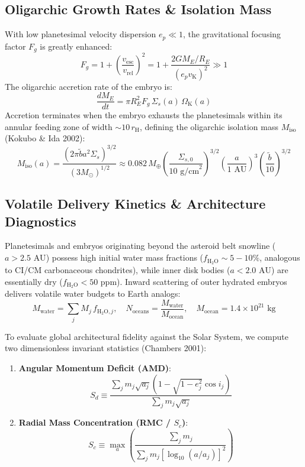 \documentclass[11pt,a4paper]{article}
\begin{document}
\subsection{Oligarchic Growth Rates \& Isolation Mass}
With low planetesimal velocity dispersion $e_p \ll 1$, the gravitational focusing factor $F_g$ is greatly enhanced:
\begin{equation}
F_g = 1 + \left(\frac{v_{\text{esc}}}{v_{\text{rel}}}\right)^2 = 1 + \frac{2 G M_E / R_E}{(e_p v_{\text{K}})^2} \gg 1
\end{equation}
The oligarchic accretion rate of the embryo is:
\begin{equation}
\frac{dM_E}{dt} = \pi R_E^2 F_g \, \Sigma_s(a) \, \Omega_{\text{K}}(a)
\end{equation}
Accretion terminates when the embryo exhausts the planetesimals within its annular feeding zone of width $\sim 10\,r_{\text{H}}$, defining the oligarchic isolation mass $M_{\text{iso}}$ (Kokubo \& Ida 2002):
\begin{equation}
M_{\text{iso}}(a) = \frac{(2\pi \tilde{b} a^2 \Sigma_s)^{3/2}}{(3 M_\odot)^{1/2}} \approx 0.082\,M_\oplus \left(\frac{\Sigma_{s,0}}{10\text{ g/cm}^2}\right)^{3/2} \left(\frac{a}{1\text{ AU}}\right)^3 \left(\frac{\tilde{b}}{10}\right)^{3/2}
\end{equation}

\subsection{Volatile Delivery Kinetics \& Architecture Diagnostics}
Planetesimals and embryos originating beyond the asteroid belt snowline ($a > 2.5\text{ AU}$) possess high initial water mass fractions ($f_{\text{H}_2\text{O}} \sim 5-10\%$, analogous to CI/CM carbonaceous chondrites), while inner disk bodies ($a < 2.0\text{ AU}$) are essentially dry ($f_{\text{H}_2\text{O}} < 50\text{ ppm}$). Inward scattering of outer hydrated embryos delivers volatile water budgets to Earth analogs:
\begin{equation}
M_{\text{water}} = \sum_{j} M_j \, f_{\text{H}_2\text{O}, j}, \quad N_{\text{oceans}} = \frac{M_{\text{water}}}{M_{\text{ocean}}}, \quad M_{\text{ocean}} = 1.4 \times 10^{21}\text{ kg}
\end{equation}

To evaluate global architectural fidelity against the Solar System, we compute two dimensionless invariant statistics (Chambers 2001):
\begin{enumerate}
    \item \textbf{Angular Momentum Deficit (AMD)}:
    \begin{equation}
    S_d \equiv \frac{\sum_j m_j \sqrt{a_j} \left(1 - \sqrt{1 - e_j^2}\cos i_j\right)}{\sum_j m_j \sqrt{a_j}}
    \end{equation}
    \item \textbf{Radial Mass Concentration (RMC / $S_c$)}:
    \begin{equation}
    S_c \equiv \max_a \left( \frac{\sum_j m_j}{\sum_j m_j \left[\log_{10}(a / a_j)\right]^2} \right)
    \end{equation}
\end{enumerate}
\end{document}
